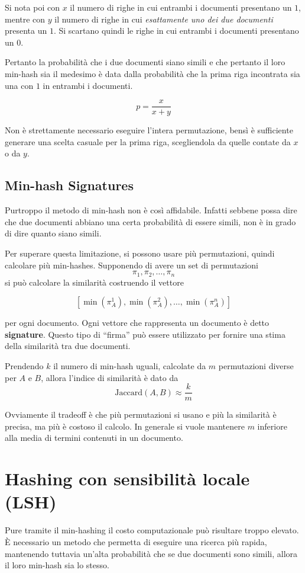     Si nota poi con $x$ il numero di righe in cui entrambi i documenti presentano un $1$, mentre con $y$ il numero di righe in cui \textit{esattamente uno dei due documenti} presenta un $1$. Si scartano quindi le righe in cui entrambi i documenti presentano un $0$.

    Pertanto la probabilità che i due documenti siano simili e che pertanto il loro min-hash sia il medesimo è data dalla probabilità che la prima riga incontrata sia una con $1$ in entrambi i documenti.

    $$ p = \frac{x}{x + y} $$

    \begin{remark}
      Non è strettamente necessario eseguire l'intera permutazione, bensì è sufficiente generare una scelta casuale per la prima riga, scegliendola da quelle contate da $x$ o da $y$.
    \end{remark}

    \subsection{Min-hash Signatures}
      Purtroppo il metodo di min-hash non è così affidabile. Infatti sebbene possa dire che due documenti abbiano una certa probabilità di essere simili, non è in grado di dire quanto siano simili.

      Per superare questa limitazione, si possono usare più permutazioni, quindi calcolare più min-hashes. Supponendo di avere un set di permutazioni 
      $$\pi_1, \pi_2, \dots, \pi_n$$
      si può calcolare la similarità costruendo il vettore

      $$ \left[ \min(\pi_A^1), \min(\pi_A^2), \dots, \min(\pi_A^n) \right] $$

      per ogni documento. Ogni vettore che rappresenta un documento è detto \textbf{signature}. Questo tipo di ``firma'' può essere utilizzato per fornire una stima della similarità tra due documenti.

      Prendendo $k$ il numero di min-hash uguali, calcolate da $m$ permutazioni diverse per $A$ e $B$, allora l'indice di similarità è dato da
      $$ \text{Jaccard}(A, B) \approx \frac{k}{m} $$

      Ovviamente il tradeoff è che più permutazioni si usano e più la similarità è precisa, ma più è costoso il calcolo. In generale si vuole mantenere $m$ inferiore alla media di termini contenuti in un documento.

  \section{Hashing con sensibilità locale (LSH)}
    Pure tramite il min-hashing il costo computazionale può risultare troppo elevato. È necessario un metodo che permetta di eseguire una ricerca più rapida, mantenendo tuttavia un'alta probabilità che se due documenti sono simili, allora il loro min-hash sia lo stesso.


